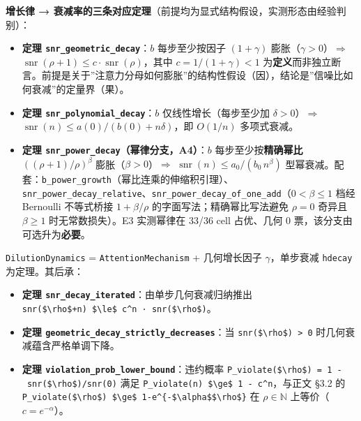 \textbf{增长律 →
衰减率的三条对应定理}（前提均为显式结构假设，实测形态由经验判别）：

\begin{itemize}
\tightlist
\item
  \textbf{定理 \texttt{snr\_geometric\_decay}}：\(b\) 每步至少按因子
  \((1+\gamma)\) 膨胀（\(\gamma>0\)）\(\Rightarrow\)
  \(\operatorname{snr}(\rho+1) \le c\cdot\operatorname{snr}(\rho)\)，其中
  \(c = 1/(1+\gamma) < 1\)
  为\textbf{定义}而非独立断言。前提是关于''注意力分母如何膨胀''的结构性假设（因），结论是''信噪比如何衰减''的定量界（果）。
\item
  \textbf{定理 \texttt{snr\_polynomial\_decay}}：\(b\)
  仅线性增长（每步至少加 \(\delta>0\)）\(\Rightarrow\)
  \(\operatorname{snr}(n) \le a(0)/(b(0)+n\delta)\)，即 \(O(1/n)\)
  多项式衰减。
\item
  \textbf{定理 \texttt{snr\_power\_decay}（幂律分支，A4）}：\(b\)
  每步至少按\textbf{精确幂比} \(((\rho+1)/\rho)^\beta\)
  膨胀（\(\beta>0\)）\(\Rightarrow\)
  \(\operatorname{snr}(n)\le a_0/(b_0\,n^\beta)\)
  型幂衰减。配套：\texttt{b\_power\_growth}（幂比连乘的伸缩积引理）、\texttt{snr\_power\_decay\_relative}、\texttt{snr\_power\_decay\_of\_one\_add}（\(0<\beta\le 1\)
  档经 Bernoulli 不等式桥接 \(1+\beta/\rho\)
  的字面写法；精确幂比写法避免 \(\rho=0\) 奇异且 \(\beta\ge1\)
  时无常数损失）。E3 实测幂律在 33/36 cell 占优、几何 0
  票，该分支由可选升为\textbf{必要}。
\end{itemize}

\texttt{DilutionDynamics} = \texttt{AttentionMechanism} + 几何增长因子
\(\gamma\)，单步衰减 \texttt{hdecay} 为定理。其后承：

\begin{itemize}
\tightlist
\item
  \textbf{定理 \texttt{snr\_decay\_iterated}}：由单步几何衰减归纳推出
  \texttt{snr(\$\textbackslash{}rho\$+n)\ \$\textbackslash{}le\$\ c\^{}n\ ·\ snr(\$\textbackslash{}rho\$)}。
\item
  \textbf{定理 \texttt{geometric\_decay\_strictly\_decreases}}：当
  \texttt{snr(\$\textbackslash{}rho\$)\ \textgreater{}\ 0}
  时几何衰减蕴含严格单调下降。
\item
  \textbf{定理 \texttt{violation\_prob\_lower\_bound}}：违约概率
  \texttt{P\_violate(\$\textbackslash{}rho\$)\ =\ 1\ -\ snr(\$\textbackslash{}rho\$)/snr(0)}
  满足
  \texttt{P\_violate(n)\ \$\textbackslash{}ge\$\ 1\ -\ c\^{}n}，与正文
  §3.2 的
  \texttt{P\_violate(\$\textbackslash{}rho\$)\ \$\textbackslash{}ge\$\ 1-e\^{}\{-\$\textbackslash{}alpha\$\$\textbackslash{}rho\$\}}
  在 \(\rho \in \mathbb{N}\) 上等价（\(c = e^{-\alpha}\)）。
\end{itemize}


